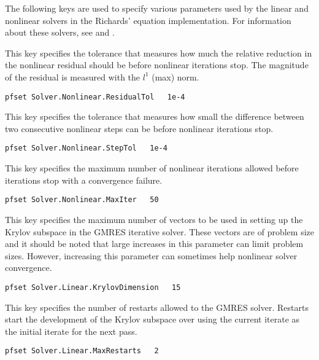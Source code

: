 The following keys are used to specify various parameters used by the linear
and nonlinear solvers in the Richards' equation implementation.
For information about these solvers, see
\cite{Woodward98} and \cite{Ashby-Falgout90}.

{This key specifies the tolerance that measures how much the relative
reduction in the nonlinear residual should be before nonlinear
iterations stop.  The magnitude of the residual is measured with
the $l^1$ (max) norm.
}
\begin{display}\begin{verbatim}
pfset Solver.Nonlinear.ResidualTol   1e-4
\end{verbatim}\end{display}

{This key specifies the tolerance that measures how small the
difference between two consecutive nonlinear steps can be before
nonlinear iterations stop.
}
\begin{display}\begin{verbatim}
pfset Solver.Nonlinear.StepTol   1e-4
\end{verbatim}\end{display}

{This key specifies the maximum number of nonlinear iterations allowed before
iterations stop with a convergence failure.
}
\begin{display}\begin{verbatim}
pfset Solver.Nonlinear.MaxIter   50
\end{verbatim}\end{display}


{This key specifies the maximum number of vectors to be used in setting up the
Krylov subspace in the GMRES iterative solver.  These vectors are of problem
size and it should be noted that large increases in this parameter can limit
problem sizes.  However, increasing this parameter can sometimes help nonlinear
solver convergence.
}
\begin{display}\begin{verbatim}
pfset Solver.Linear.KrylovDimension   15
\end{verbatim}\end{display}

{This key specifies the number of restarts allowed to the GMRES solver.
Restarts start the development of the Krylov subspace over using the current
iterate as the initial iterate for the next pass.
}
\begin{display}\begin{verbatim}
pfset Solver.Linear.MaxRestarts   2
\end{verbatim}\end{display}

